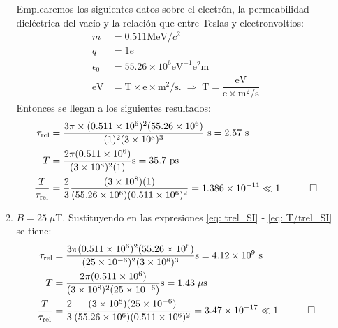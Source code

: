 \documentclass[11pt]{article}
\newcommand{\trel}{\tau_\textrm{rel}}
\begin{document}
\begin{enumerate}[label=\roman*{})]
\begin{enumerate}[label=\alph*)]
        Emplearemos los siguientes datos sobre el electrón, la permeabilidad dieléctrica del vacío y la relación que entre Teslas y electronvoltios: 
        \begin{align*}
            m &= 0.511 \textrm{MeV}/c^2\\ 
            q &= 1e \\ 
            \epsilon_0 &= 55.26\times10^6 \text{eV}^{-1}\text{e}^2\text{m}\\
            \textrm{eV} &= \textrm{T}\times \text{e}\times \text{m}^2/\text{s} .\;\Rightarrow\; \text{T} = \dfrac{\text{eV}}{\text{e}\times\text{m}^2/\text{s}}
        \end{align*} 
        Entonces se llegan a los siguientes resultados: 
        \begin{align*}
            \trel &= \dfrac{3\pi\times (0.511\times10^6)^2(55.26\times10^6)}{(1)^2(3\times10^8)^3} \textrm{ s} = 2.57\text{ s} \\ 
            T &= \dfrac{2\pi (0.511\times10^6)}{(3\times10^8)^2(1)} \text{s} = 35.7\text{ ps}\\ 
            \dfrac{T}{\trel} &= \dfrac{2}{3}\dfrac{(3\times10^8)(1)}{(55.26\times 10^6)(0.511\times10^{6})^2} = 1.386\times 10^{-11}\ll 1 \quad \qed   
        \end{align*}
    \item $B = 25\;\mu$T. Sustituyendo en las expresiones \eqref{eq: trel_SI} - \eqref{eq: T/trel_SI} se tiene: 
    \begin{align*}
        \trel &= \dfrac{3\pi(0.511\times10^6)^2(55.26\times10^6)}{(25\times 10^{-6})^2(3\times10^8)^3} \textrm{s} =4.12\times 10^9 \text{ s} \\ 
        T &= \dfrac{2\pi (0.511\times10^6)}{(3\times10^8)^2(25\times10^{-6})} \text{s} = 1.43\;\mu\text{s}\\ 
        \dfrac{T}{\trel} &= \dfrac{2}{3}\dfrac{(3\times10^8)(25\times10^{-6})}{(55.26\times 10^6)(0.511\times10^{6})^2} = 3.47\times 10^{-17}\ll 1 \quad \qed   
    \end{align*}
    \end{enumerate} 
\end{enumerate}
\end{document}
